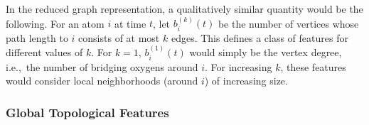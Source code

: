 \begin{itemize}
    In the reduced graph representation, a qualitatively similar quantity would be the following.  For an atom $i$ at time $t$, let $b^{(k)}_i(t)$ be the number of vertices whose path length to $i$ consists of at most $k$ edges. This defines a class of features for different values of $k$.  For $k=1$, $b^{(1)}_i(t)$ would simply be the vertex degree, i.e.,\ the number of bridging oxygens around $i$.  For increasing $k$, these features would consider local neighborhoods (around $i$) of increasing size.
    
\end{itemize}

\subsubsection{Global Topological Features}


    
